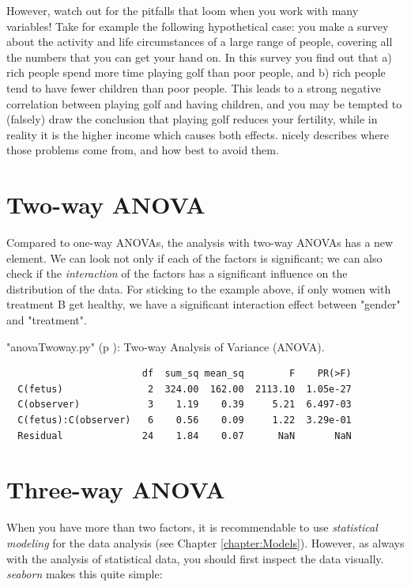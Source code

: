 However, watch out for the pitfalls that loom when you work with many variables! Take for example the following hypothetical case: you make a survey about the activity and life circumstances of a large range of people, covering all the numbers that you can get your hand on. In this survey you find out that a) rich people spend more time playing golf than poor people, and b) rich people tend to have fewer children than poor people. This leads to a strong negative correlation between playing golf and having children, and you may be tempted to (falsely) draw the conclusion that playing golf reduces your fertility, while in reality it is the higher income which causes both effects. \cite{Kaplan2009} nicely describes where those problems come from, and how best to avoid them.

\section{Two-way ANOVA} \label{sec:anovaTwoWay}  

Compared to one-way ANOVAs, the analysis with two-way ANOVAs has a new element. We can look not only if each of the factors is significant; we can also check if the \emph{interaction} of the factors has a significant influence on the distribution of the data. For sticking to the example above, if only women with treatment B get healthy, we have a significant interaction effect between "gender" and "treatment".

\PyImg "anovaTwoway.py" (p \pageref{py:anovaTwoway}): Two-way Analysis of Variance (ANOVA).

\begin{verbatim}
                        df  sum_sq mean_sq        F    PR(>F)
  C(fetus)               2  324.00  162.00  2113.10  1.05e-27
  C(observer)            3    1.19    0.39     5.21  6.497-03
  C(fetus):C(observer)   6    0.56    0.09     1.22  3.29e-01
  Residual              24    1.84    0.07      NaN       NaN
\end{verbatim}

\section{Three-way ANOVA} \label{sec:anovaThreeWay} 

When you have more than two factors, it is recommendable to use \emph{statistical modeling} for the data analysis (see Chapter \ref{chapter:Models}). However, as always with the analysis of statistical data, you should first inspect the data visually. \emph{seaborn} makes this quite simple:

